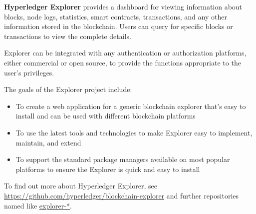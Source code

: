 \textbf{Hyperledger Explorer} provides a dashboard for viewing information about blocks, node logs, statistics, smart contracts, transactions, and any other information stored in the blockchain. 
Users can query for specific blocks or transactions to view the complete details. 

Explorer can be integrated with any authentication or authorization platforms, either commercial or open source, to provide the functions appropriate to the user's privileges. 

The goals of the Explorer project include:
\begin{itemize}
\item To create a web application for a generic blockchain explorer that's easy to install and can be used with different blockchain platforms
\item To use the latest tools and technologies to make Explorer easy to implement, maintain, and extend
\item To support the standard package managers available on most popular platforms to ensure the Explorer is quick and easy to install
\end{itemize}

To find out more about Hyperledger Explorer,  see \url{https://github.com/hyperledger/blockchain-explorer} and further repositories named like \url{explorer-*}.

